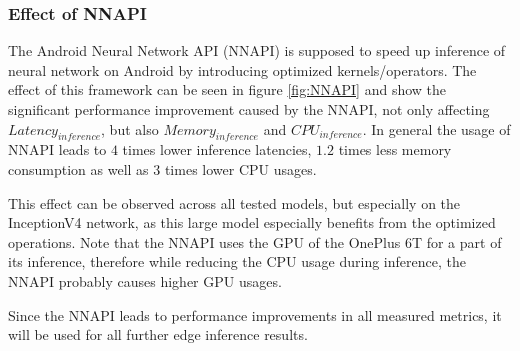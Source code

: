 \subsubsection{Effect of NNAPI}
The Android Neural Network API (NNAPI) is supposed to speed up inference of neural network on Android by introducing optimized kernels/operators. 
The effect of this framework can be seen in figure \ref{fig:NNAPI} and show the significant performance improvement caused by the NNAPI, not only affecting $Latency_{inference}$, but also $Memory_{inference}$ and $CPU_{inference}$.
In general the usage of NNAPI leads to $4$ times lower inference latencies, $1.2$ times less memory consumption as well as $3$ times lower CPU usages.

This effect can be observed across all tested models, but especially on the InceptionV4 network, as this large model especially benefits from the optimized operations.
Note that the NNAPI uses the GPU of the OnePlus 6T for a part of its inference, therefore while reducing the CPU usage during inference, the NNAPI probably causes higher GPU usages.

Since the NNAPI leads to performance improvements in all measured metrics, it will be used for all further edge inference results.

